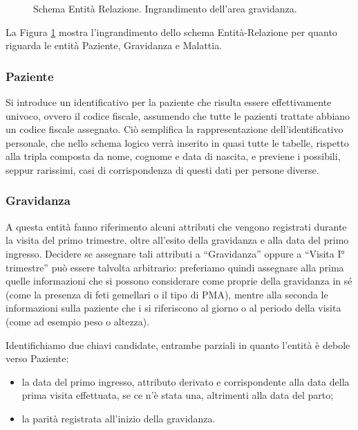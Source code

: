 \begin{figure}
    \centering
    
    \caption{Schema Entità Relazione. Ingrandimento dell'area gravidanza.}
    \label{pregnancyerdiagram}
\end{figure}

La Figura \ref{pregnancyerdiagram} mostra l'ingrandimento dello schema Entità-Relazione per quanto riguarda le entità Paziente, Gravidanza e Malattia.

\subsubsection{Paziente}

Si introduce un identificativo per la paziente che risulta essere effettivamente univoco, ovvero il codice fiscale, assumendo che tutte le pazienti trattate abbiano un codice fiscale assegnato.
Ciò semplifica la rappresentazione dell'identificativo personale, che nello schema logico verrà inserito in quasi tutte le tabelle, rispetto alla tripla composta da nome, cognome e data di nascita, e previene i possibili, seppur rarissimi, casi di corrispondenza di questi dati per persone diverse.

\subsubsection{Gravidanza}

A questa entità fanno riferimento alcuni attributi che vengono registrati durante la visita del primo trimestre, oltre all'esito della gravidanza e alla data del primo ingresso.
Decidere se assegnare tali attributi a \enquote{Gravidanza} oppure a \enquote{Visita I° trimestre} può essere talvolta arbitrario: preferiamo quindi assegnare alla prima quelle informazioni che si possono considerare come proprie della gravidanza in sé (come la presenza di feti gemellari o il tipo di PMA), mentre alla seconda le informazioni sulla paziente che i si riferiscono al giorno o al periodo della visita (come ad esempio peso o altezza).

Identifichiamo due chiavi candidate, entrambe parziali in quanto l'entità è debole verso Paziente:
\begin{itemize}
\item la data del primo ingresso, attributo derivato e corrispondente alla data della prima visita effettuata, se ce n'è stata una, altrimenti alla data del parto;
\item la parità registrata all'inizio della gravidanza.
\end{itemize}

